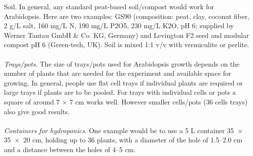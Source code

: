 Soil. In general, any standard peat-based soil/compost would work for Arabidopsis. Here are two examples: GS90 (composition: peat, clay, coconut fiber, 2 g/L salt, 160 mg/L N, 190 mg/L P2O5, 230 mg/L K2O, pH 6; supplied by Werner Tantau GmbH \& Co. KG, Germany) \parencite{Koslowsky2008} and Levington F2 seed and modular compost pH 6 (Green-tech, UK). Soil is mixed 1:1 v/v with vermiculite or perlite. \\ \\
\textit{Trays/pots}. The size of trays/pots used for Arabidopsis growth depends on the number of plants that are needed for the experiment and available space for growing. In general, people use flat cell trays if individual plants are required or large trays if plants are to be pooled. For trays with individual cells or pots a square of around 7 × 7 cm works well. However smaller cells/pots (36 cells trays) also give good results. \\ \\
\textit{Containers for hydroponics}. One example would be to use a 5 L container 35  ×  35  ×  20 cm, holding up to 36 plants, with a diameter of the hole of 1.5–2.0 cm and a distance between the holes of 4–5 cm.

